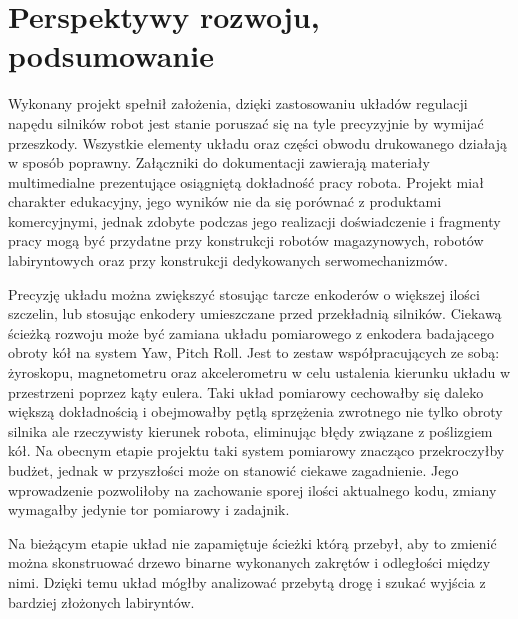 \documentclass[11pt]{article}
\begin{document}
\section{Perspektywy rozwoju, podsumowanie}
Wykonany projekt spełnił założenia, dzięki zastosowaniu układów regulacji napędu silników robot jest stanie poruszać się na tyle precyzyjnie by wymijać przeszkody.
Wszystkie elementy układu oraz części obwodu drukowanego działają w sposób poprawny.
Załączniki do dokumentacji zawierają materiały multimedialne prezentujące osiągniętą dokładność pracy robota.
Projekt miał charakter edukacyjny, jego wyników nie da się porównać z produktami komercyjnymi, jednak zdobyte podczas jego realizacji doświadczenie i fragmenty pracy mogą być przydatne przy konstrukcji robotów magazynowych, robotów labiryntowych oraz przy konstrukcji dedykowanych serwomechanizmów.

Precyzję układu można zwiększyć stosując tarcze enkoderów o większej ilości szczelin, lub stosując enkodery umieszczane przed przekładnią silników.
Ciekawą ścieżką rozwoju może być zamiana układu pomiarowego z enkodera badającego obroty kół na system Yaw, Pitch Roll. Jest to zestaw współpracujących ze sobą: żyroskopu, magnetometru oraz akcelerometru w celu ustalenia kierunku układu w przestrzeni poprzez kąty eulera.
Taki układ pomiarowy cechowałby się daleko większą dokładnością i obejmowałby pętlą sprzężenia zwrotnego nie tylko obroty silnika ale rzeczywisty kierunek robota, eliminując błędy związane z poślizgiem kół.
Na obecnym etapie projektu taki system pomiarowy znacząco przekroczyłby budżet, jednak w przyszłości może on stanowić ciekawe zagadnienie.
Jego wprowadzenie pozwoliłoby na zachowanie sporej ilości aktualnego kodu, zmiany wymagałby jedynie tor pomiarowy i zadajnik.

Na bieżącym etapie układ nie zapamiętuje ścieżki którą przebył, aby to zmienić można skonstruować drzewo binarne wykonanych zakrętów i odległości między nimi. Dzięki temu układ mógłby analizować przebytą drogę i szukać wyjścia z bardziej złożonych labiryntów.
\end{document}
